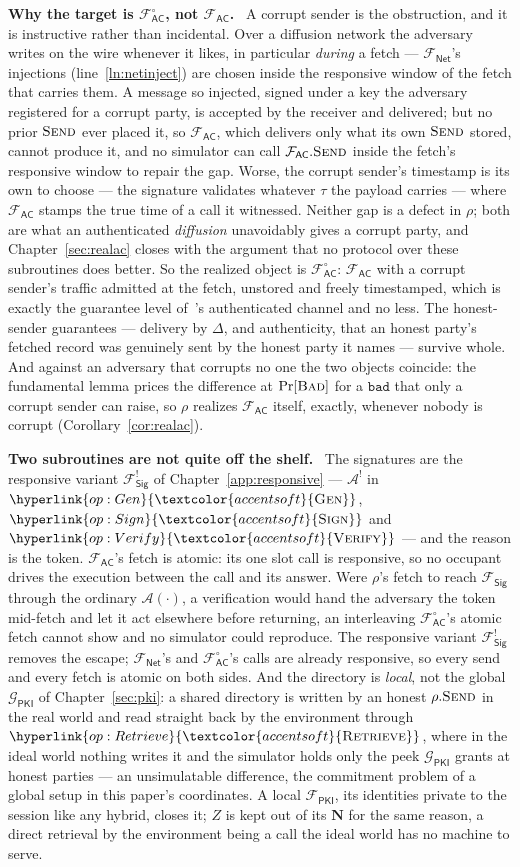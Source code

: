 \documentclass[10pt,oneside,openany]{book}
\newcommand{\admits}{\mathbf{N}}
\newcommand{\Adv}{\mathcal{A}}
\newcommand{\op}[1]{\textnormal{\textsc{#1}}}
\newcommand{\opl}[1]{\hyperlink{op:#1}{\textcolor{accentsoft}{\op{#1}}}}
\newcommand{\Bad}{\op{Bad}}
\newcommand{\Fsig}{\mathcal{F}_{\mathsf{Sig}}}
\newcommand{\Gpki}{\mathcal{G}_{\mathsf{PKI}}}
\newcommand{\Fnet}{\mathcal{F}_{\mathsf{Net}}}
\newcommand{\Fac}{\mathcal{F}_{\mathsf{AC}}}
\newcommand{\Facz}{\mathcal{F}^{\circ}_{\mathsf{AC}}}
\newcommand{\Fpki}{\mathcal{F}_{\mathsf{PKI}}}
\newcommand{\V}[1]{\mathtt{#1}}
\newcommand{\heading}[1]{\medskip\par\noindent\textcolor{accent}{\textbf{#1.}}\ }
\theoremstyle{accentdef}
\theoremstyle{accentplain}
\begin{document}
\heading{Why the target is $\Facz$, not $\Fac$} A corrupt sender is the obstruction, and it is
instructive rather than incidental. Over a diffusion network the adversary writes on the wire
whenever it likes, in particular \emph{during} a fetch --- $\Fnet$'s injections
(line~\ref{ln:netinject}) are chosen inside the responsive window of the fetch that carries them.
A message so injected, signed under a key the adversary registered for a corrupt party, is
accepted by the receiver and delivered; but no prior $\op{Send}$ ever placed it, so $\Fac$, which
delivers only what its own $\op{Send}$ stored, cannot produce it, and no simulator can call
$\Fac.\op{Send}$ inside the fetch's responsive window to repair the gap. Worse, the corrupt
sender's timestamp is its own to choose --- the signature validates whatever $\tau$ the payload
carries --- where $\Fac$ stamps the true time of a call it witnessed. Neither gap is a defect in
$\rho$; both are what an authenticated \emph{diffusion} unavoidably gives a corrupt party, and
Chapter~\ref{sec:realac} closes with the argument that no protocol over these subroutines does
better. So the realized object is $\Facz$: $\Fac$ with a corrupt sender's traffic admitted at the
fetch, unstored and freely timestamped, which is exactly the guarantee level
of~\cite{Canetti20}'s authenticated channel and no less. The honest-sender guarantees ---
delivery by $\Delta$, and authenticity, that an honest party's fetched record was genuinely sent
by the honest party it names --- survive whole. And against an adversary that corrupts no one the
two objects coincide: the fundamental lemma prices the difference at $\Pr[\Bad]$ for a $\V{bad}$
that only a corrupt sender can raise, so $\rho$ realizes $\Fac$ itself, exactly, whenever nobody
is corrupt (Corollary~\ref{cor:realac}).

\heading{Two subroutines are not quite off the shelf} The signatures are the responsive variant
$\Fsig^{!}$ of Chapter~\ref{app:responsive} --- $\Adv^{!}$ in $\opl{Gen}$, $\opl{Sign}$ and
$\opl{Verify}$ --- and the reason is the token. $\Fac$'s fetch is atomic: its one slot call is
responsive, so no occupant drives the execution between the call and its answer. Were $\rho$'s
fetch to reach $\Fsig$ through the ordinary $\Adv(\cdot)$, a verification would hand the adversary
the token mid-fetch and let it act elsewhere before returning, an interleaving $\Facz$'s atomic
fetch cannot show and no simulator could reproduce. The responsive variant $\Fsig^{!}$ removes the escape; $\Fnet$'s and
$\Facz$'s calls are already responsive, so every send and every fetch is atomic on both sides.
And the directory is \emph{local}, not the global $\Gpki$ of Chapter~\ref{sec:pki}: a shared
directory is written by an honest $\rho.\op{Send}$ in the real world and read straight back by the
environment through $\opl{Retrieve}$, where in the ideal world nothing writes it and the simulator
holds only the peek $\Gpki$ grants at honest parties --- an unsimulatable difference, the
commitment problem of a global setup in this paper's coordinates. A local $\Fpki$, its identities
private to the session like any hybrid, closes it; $Z$ is kept out of its $\admits$ for the same
reason, a direct retrieval by the environment being a call the ideal world has no machine to
serve.
\end{document}
